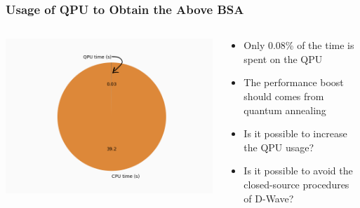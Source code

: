 \documentclass[aspectratio=169]{beamer}
\begin{document}
\begin{frame}
    \frametitle{Usage of QPU to Obtain the Above BSA}

    \begin{columns}
        \begin{column}{0.5\textwidth}
            \centering
            \includegraphics[height=0.65\textheight]{img/piechart2.png}
        \end{column}
        \begin{column}{0.5\textwidth}
            \begin{itemize}
                \item Only 0.08\% of the time is spent on the QPU
                \item The performance boost should comes from quantum annealing
                \item Is it possible to increase the QPU usage?
                \item Is it possible to avoid the closed-source procedures of D-Wave?
            \end{itemize}
        \end{column}
        
    \end{columns}

\end{frame}
\end{document}
